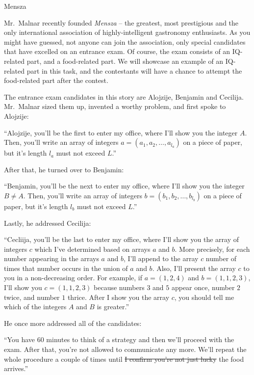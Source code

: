 \begin{statement}[
  problempoints=100,
  timelimit=5 seconds,
  memorylimit=512 MiB,
]{Mensza}

Mr.\ Malnar recently founded \textit{Mensza} -- the greatest, most prestigious
and the only international association of highly-intelligent gastronomy
enthusiasts. As you might have guessed, not anyone can join the association,
only special candidates that have excelled on an entrance exam.  Of course,
the exam consists of an IQ-related part, and a food-related part.  We will
showcase an example of an IQ-related part in this task, and the contestants
will have a chance to attempt the food-related part after the contest.

The entrance exam candidates in this story are Alojzije, Benjamin and Cecilija.
Mr.\ Malnar sized them up, invented a worthy problem, and first spoke to Alojzije:

``Alojzije, you'll be the first to enter my office, where I'll show you the
  integer $A$. Then, you'll write an array of integers $a = (a_1, a_2,
\ldots, a_{l_a})$ on a piece of paper, but it's length $l_a$ must not exceed
$L$.''

After that, he turned over to Benjamin:

``Benjamin, you'll be the next to enter my office, where I'll show you the
integer $B \ne A$. Then, you'll write an array of integers $b = (b_1, b_2,
\ldots, b_{l_b})$ on a piece of paper, but it's length $l_b$ must not exceed
$L$.''

Lastly, he addressed Cecilija:

``Cecliija, you'll be the last to enter my office, where I'll show you the
array of integers $c$ which I've determined based on arrays $a$ and $b$. More
precisely, for each number appearing in the arrays $a$ and $b$, I'll append
to the array $c$ number of times that number occurs in the union of $a$ and
$b$. Also, I'll present the array $c$ to you in a non-decreasing order. For
example, if $a = (1, 2, 4)$ and $b = (1, 1, 2, 3)$, I'll show you
$c = (1, 1, 2, 3)$ because numbers $3$ and $5$ appear once, number $2$ twice,
and number $1$ thrice. After I show you the array $c$, you should tell me which
of the integers $A$ and $B$ is greater.''

He once more addressed all of the candidates:

``You have 60 minutes to think of a strategy and then we'll proceed with the
exam. After that, you're not allowed to communicate any more. We'll repeat the
whole procedure a couple of times until \sout{I confirm you're not just lucky}
the food arrives.''


\end{statement}
